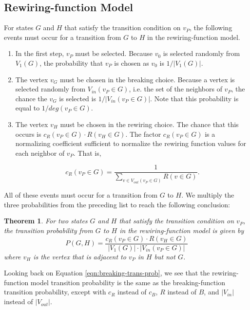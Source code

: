 \documentclass[a4paper,10pt]{article}
\newtheorem{theorem}{Theorem}
\begin{document}
\subsection{Rewiring-function Model}

For states $G$ and $H$ that satisfy the transition condition on $v_P$, the following events must occur for a transition from $G$ to $H$ in the rewiring-function model.

\begin{enumerate}
 \item In the first step, $v_P$ must be selected. Because $v_0$ is selected randomly from $V_1(G)$, the probability that $v_P$ is chosen as $v_0$ is $1 / |V_1(G)|$.
 \item The vertex $v_G$ must be chosen in the breaking choice. Because a vertex is selected randomly from $V_{in}(v_P \in G)$, i.e. the set of the neighbors of $v_P$,  the chance the $v_G$ is selected is $1/|V_{in}(v_P \in G)|$. Note that this probability is equal to $1 / deg(v_P \in G)$. 

 \item The vertex $v_H$ must be chosen in the rewiring choice. The chance that this occurs is $c_R(v_P \in G) \cdot R(v_H \in G)$. The factor $c_R(v_P \in G)$ is a normalizing coefficient sufficient to normalize the rewiring function values for each neighbor of $v_P$. That is,

   \begin{equation}
    c_R(v_P \in G) = \frac{1}{\sum \limits_{v \in V_{out}(v_P \in G)} R(v \in G)}.
   \end{equation}
\end{enumerate}

All of these events must occur for a transition from $G$ to $H$. We multiply the three probabilities from the preceding list to reach the following conclusion:

\begin{theorem}
\label{thm:rewiring-trans-prob}
For two states $G$ and $H$ that satisfy the transition condition on $v_P$, the transition probability from $G$ to $H$ in the rewiring-function model is given by
\begin{equation}
\label{eqn:rewiring-trans-prob}
P(G, H) = \frac{c_R(v_P \in G) \cdot R(v_H \in G)}{|V_1(G)| \cdot |V_{in}(v_P \in G)|}
\end{equation}
where $v_H$ is the vertex that is adjacent to $v_P$ in $H$ but not $G$.
\end{theorem}

Looking back on Equation \ref{eqn:breaking-trans-prob}, we see that the rewiring-function model transition probability is the same as the breaking-function transition probability, except with $c_R$ instead of $c_B$, $R$ instead of $B$, and $|V_{in}|$ instead of $|V_{out}|$.
\end{document}
